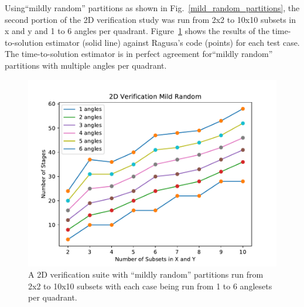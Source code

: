\documentclass[times,final]{elsarticle}
\begin{document}
Using``mildly random'' partitions as shown in Fig.~\ref{mild_random_partitions}, the second portion of the 2D verification study was run from 2x2 to 10x10 subsets in x and y and 1 to 6 angles per quadrant.  Figure~\ref{mild_random_verification} shows the results of the time-to-solution estimator (solid line) against Ragusa's code (points) for each test case. The time-to-solution estimator is in perfect agreement for``mildly random'' partitions with multiple angles per quadrant.

\begin{figure}[H]
\centering
\includegraphics[scale=0.8]{../figures/mild_random_verification.pdf}
\caption{A 2D verification suite with ``mildly random'' partitions run from 2x2 to 10x10 subsets with each case being run from 1 to 6 anglesets per quadrant.}
\label{mild_random_verification}
\end{figure}

\end{document}
